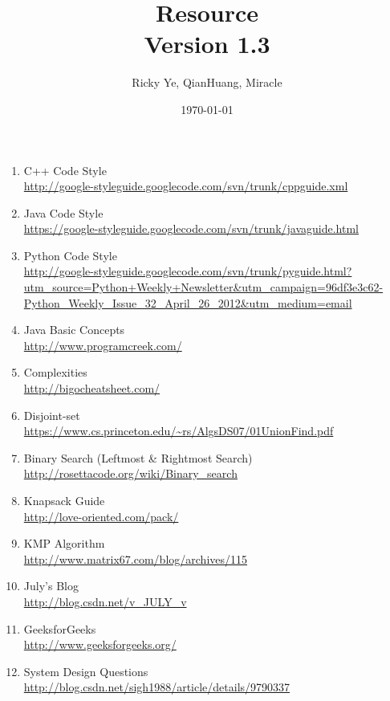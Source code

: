 \documentclass[paper=a4, fontsize=11pt]{scrartcl} %
\begin{document}
\title{Resource\\\textnormal{\small{Version 1.3}}}
\author{Ricky Ye, QianHuang, Miracle}
\date{\today}
\maketitle

\begin{enumerate}[label=\upshape(\arabic*\upshape)]
  \item C++ Code Style\\ \url{http://google-styleguide.googlecode.com/svn/trunk/cppguide.xml}
  \item Java Code Style\\ \url{https://google-styleguide.googlecode.com/svn/trunk/javaguide.html}
  \item Python Code Style\\ \url{http://google-styleguide.googlecode.com/svn/trunk/pyguide.html?utm_source=Python+Weekly+Newsletter&utm_campaign=96df3e3c62-Python_Weekly_Issue_32_April_26_2012&utm_medium=email}
  \item Java Basic Concepts\\ \url{http://www.programcreek.com/}
  \item Complexities\\ \url{http://bigocheatsheet.com/}
  \item Disjoint-set\\ \url{https://www.cs.princeton.edu/~rs/AlgsDS07/01UnionFind.pdf}
  \item Binary Search (Leftmost \& Rightmost Search)\\ \url{http://rosettacode.org/wiki/Binary_search} 
  \item Knapsack Guide\\ \url{http://love-oriented.com/pack/}
  \item KMP Algorithm\\ \url{http://www.matrix67.com/blog/archives/115}
  \item July's Blog\\ \url{http://blog.csdn.net/v_JULY_v}
  \item GeeksforGeeks\\ \url{http://www.geeksforgeeks.org/}
  \item System Design Questions\\ \url{http://blog.csdn.net/sigh1988/article/details/9790337}
\end{enumerate}
\end{document}
